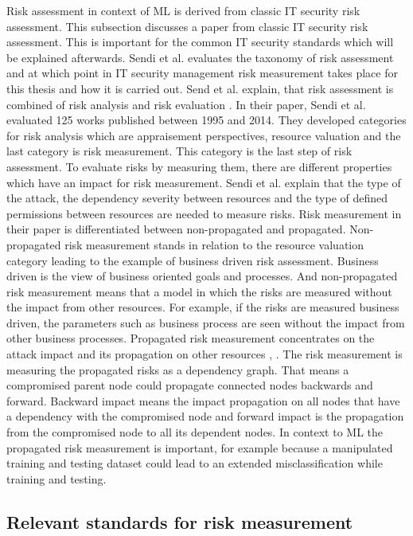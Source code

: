 Risk assessment in context of ML is derived from classic IT security risk assessment. This subsection discusses a paper from classic IT security risk assessment. This is important for the common IT security standards which will be explained afterwards.
Sendi et al. \cite{DBLP:journals/compsec/SendiAC16} evaluates the taxonomy of risk assessment and at which point in IT security management risk measurement takes place for this thesis and
how it is carried out. Send et al. explain, that risk assessment is combined of risk analysis and risk evaluation \cite{kersten_reuter_schroeder_wolfenstetter_2013}. In their paper, Sendi et al. evaluated 125 works published between 1995 and 2014. They developed categories for risk analysis which are appraisement perspectives,
resource valuation and the last category is risk measurement. This category is the last step of risk assessment. To evaluate risks by measuring them, there are different properties which
have an impact for risk measurement. Sendi et al. explain that the type of the attack, the dependency severity between resources and the type of defined permissions between resources are
needed to measure risks. Risk measurement in their paper is differentiated between non-propagated and propagated. Non-propagated risk measurement stands in relation to the resource
valuation category leading to the example of business driven risk assessment. Business driven is the view of business oriented goals and processes. And non-propagated risk measurement
means that a model in which the risks are measured without the impact from other resources. For example, if the risks are measured business driven, the parameters such as business process
are seen without the impact from other business processes. Propagated risk measurement concentrates on the attack impact and its propagation on other resources \cite{DBLP:conf/lcn/JahnkeTM07}, \cite{DBLP:conf/esorics/KheirCCD10}. The risk measurement is
measuring the propagated risks as a dependency graph. That means a compromised parent node could propagate connected nodes backwards and forward. Backward impact means the impact
propagation on all nodes that have a dependency with the compromised node and forward impact is the propagation from the compromised node to all its dependent nodes. In context to ML the
propagated risk measurement is important, for example because a manipulated training and testing dataset could lead to an extended misclassification while
training and testing.

\subsection{Relevant standards for risk measurement}

